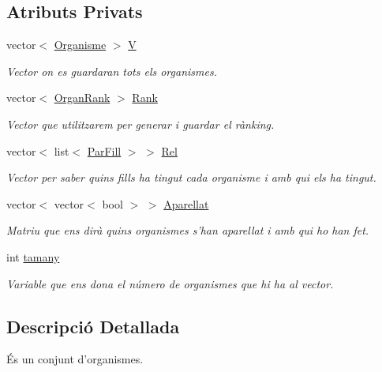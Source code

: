\subsection*{Atributs Privats}
\begin{DoxyCompactItemize}
\item 
vector$<$ \hyperlink{class_organisme}{Organisme} $>$ \hyperlink{class_conjunt_org_adab11e0ac8295072ec682716478a535a}{V}
\begin{DoxyCompactList}\small\item\em Vector on es guardaran tots els organismes. \end{DoxyCompactList}\item 
vector$<$ \hyperlink{struct_organ_rank}{Organ\-Rank} $>$ \hyperlink{class_conjunt_org_ae566806533e21f56caf27480d342c460}{Rank}
\begin{DoxyCompactList}\small\item\em Vector que utilitzarem per generar i guardar el rànking. \end{DoxyCompactList}\item 
vector$<$ list$<$ \hyperlink{struct_par_fill}{Par\-Fill} $>$ $>$ \hyperlink{class_conjunt_org_a0c5cd7bac2272f4672a08ca5b2ea3f93}{Rel}
\begin{DoxyCompactList}\small\item\em Vector per saber quins fills ha tingut cada organisme i amb qui els ha tingut. \end{DoxyCompactList}\item 
vector$<$ vector$<$ bool $>$ $>$ \hyperlink{class_conjunt_org_a9782fdb4c89e8dd61762453de8f77fcb}{Aparellat}
\begin{DoxyCompactList}\small\item\em Matriu que ens dirà quins organismes s'han aparellat i amb qui ho han fet. \end{DoxyCompactList}\item 
int \hyperlink{class_conjunt_org_a468e7686498561628ad731ea196df8b5}{tamany}
\begin{DoxyCompactList}\small\item\em Variable que ens dona el número de organismes que hi ha al vector. \end{DoxyCompactList}\end{DoxyCompactItemize}


\subsection{Descripció Detallada}
És un conjunt d'organismes. 

